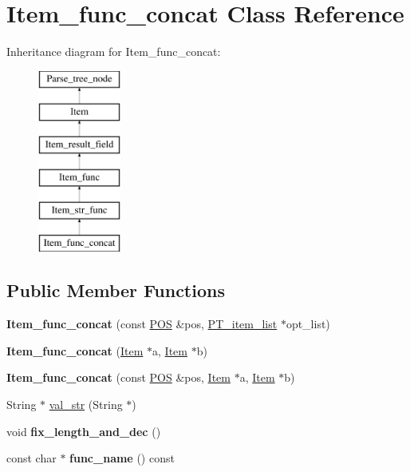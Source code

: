 \hypertarget{classItem__func__concat}{}\section{Item\+\_\+func\+\_\+concat Class Reference}
\label{classItem__func__concat}
Inheritance diagram for Item\+\_\+func\+\_\+concat\+:\begin{figure}[H]
\begin{center}
\leavevmode
\includegraphics[height=6.000000cm]{classItem__func__concat}
\end{center}
\end{figure}
\subsection*{Public Member Functions}
\begin{DoxyCompactItemize}
\item 
\mbox{\label{classItem__func__concat_a91454fd109ffd0bf0ffec08feb107d24}} 
{\bfseries Item\+\_\+func\+\_\+concat} (const \mbox{\hyperlink{structYYLTYPE}{P\+OS}} \&pos, \mbox{\hyperlink{classPT__item__list}{P\+T\+\_\+item\+\_\+list}} $\ast$opt\+\_\+list)
\item 
\mbox{\label{classItem__func__concat_a894cda11feec202f0ec92b3bfc526d47}} 
{\bfseries Item\+\_\+func\+\_\+concat} (\mbox{\hyperlink{classItem}{Item}} $\ast$a, \mbox{\hyperlink{classItem}{Item}} $\ast$b)
\item 
\mbox{\label{classItem__func__concat_a6929b61b652dbf88584d5514e6e964c6}} 
{\bfseries Item\+\_\+func\+\_\+concat} (const \mbox{\hyperlink{structYYLTYPE}{P\+OS}} \&pos, \mbox{\hyperlink{classItem}{Item}} $\ast$a, \mbox{\hyperlink{classItem}{Item}} $\ast$b)
\item 
String $\ast$ \mbox{\hyperlink{classItem__func__concat_a254950f94738bc407689275cf64bbcaa}{val\+\_\+str}} (String $\ast$)
\item 
\mbox{\label{classItem__func__concat_ab746a98d22d9901a5bb812144481f515}} 
void {\bfseries fix\+\_\+length\+\_\+and\+\_\+dec} ()
\item 
\mbox{\label{classItem__func__concat_ac6f53f4f6a19bbc8e41b0e5e5899e9fc}} 
const char $\ast$ {\bfseries func\+\_\+name} () const
\end{DoxyCompactItemize}

